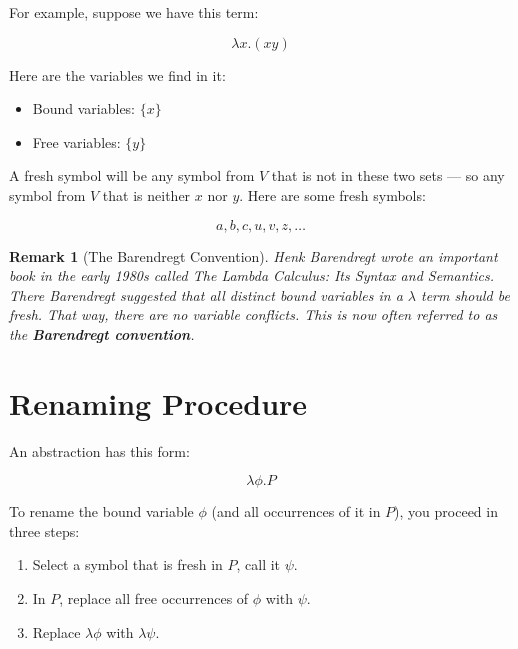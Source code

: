 \documentclass{book}
\numberwithin{equation}{chapter}
\newcommand{\vocab}{\textbf}
\newtheorem{remark}{Remark}
\begin{document}
\noindent
For example, suppose we have this term:

\begin{equation}
\lambda x.(x y)
\end{equation}

\noindent
Here are the variables we find in it:

\begin{itemize}
\item{Bound variables: $\{ x \}$}
\item{Free variables: $\{ y \}$}
\end{itemize}

\noindent
A fresh symbol will be any symbol from $V$ that is not in these two sets --- so any symbol from $V$ that is neither $x$ nor $y$. Here are some fresh symbols:

\begin{equation}
a, b, c, u, v, z, \ldots
\end{equation}

\noindent
\begin{remark}[The Barendregt Convention]
Henk Barendregt wrote an important book in the early 1980s called \textit{The Lambda Calculus: Its Syntax and Semantics}. There Barendregt suggested that all distinct bound variables in a $\lambda$ term should be fresh. That way, there are no variable conflicts. This is now often referred to as the \vocab{Barendregt convention}.
\end{remark}


\section{Renaming Procedure}

An abstraction has this form:

\begin{equation}
\lambda \phi.P
\end{equation}

\noindent
To rename the bound variable $\phi$ (and all occurrences of it in $P$), you proceed in three steps:

\begin{enumerate}
\item{Select a symbol that is fresh in $P$, call it $\psi$.}
\item{In $P$, replace all free occurrences of $\phi$ with $\psi$.}
\item{Replace $\lambda \phi$ with $\lambda \psi$.}
\end{enumerate}
\end{document}
